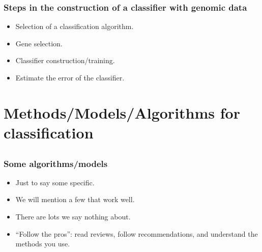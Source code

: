 \begin{frame}
\frametitle{Steps in the construction of a classifier with genomic data}
\begin{itemize}
\item Selection of a classification algorithm.
\item Gene selection.
\item Classifier construction/training.
\item Estimate the error of the classifier.
\end{itemize}
\end{frame}




\section[Methods]{Methods/Models/Algorithms for classification}
\subsection{}
\begin{frame}
\frametitle{Some algorithms/models}
\begin{itemize}
\item Just to say some specific.
\item We will mention a few that work well.
\item There are lots we say nothing about.
\item ``Follow the pros'': read reviews, follow recommendations, and
  understand the methods you use.
\end{itemize}
\end{frame}


